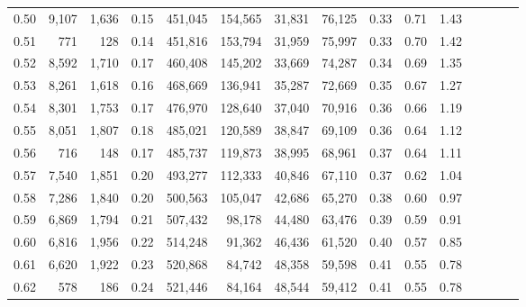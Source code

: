 \begin{tabular}{rrrcrrrrrrrrrrr}
0.50 &   9,107 &  1,636 &                                       0.15 &  451,045 &  154,565 &   31,831 &   76,125 &  0.33 &  0.71 &                         1.43 \\
0.51 &     771 &    128 &                                       0.14 &  451,816 &  153,794 &   31,959 &   75,997 &  0.33 &  0.70 &                         1.42 \\
0.52 &   8,592 &  1,710 &                                       0.17 &  460,408 &  145,202 &   33,669 &   74,287 &  0.34 &  0.69 &                         1.35 \\
0.53 &   8,261 &  1,618 &                                       0.16 &  468,669 &  136,941 &   35,287 &   72,669 &  0.35 &  0.67 &                         1.27 \\
0.54 &   8,301 &  1,753 &                                       0.17 &  476,970 &  128,640 &   37,040 &   70,916 &  0.36 &  0.66 &                         1.19 \\
0.55 &   8,051 &  1,807 &                                       0.18 &  485,021 &  120,589 &   38,847 &   69,109 &  0.36 &  0.64 &                         1.12 \\
0.56 &     716 &    148 &                                       0.17 &  485,737 &  119,873 &   38,995 &   68,961 &  0.37 &  0.64 &                         1.11 \\
0.57 &   7,540 &  1,851 &                                       0.20 &  493,277 &  112,333 &   40,846 &   67,110 &  0.37 &  0.62 &                         1.04 \\
0.58 &   7,286 &  1,840 &                                       0.20 &  500,563 &  105,047 &   42,686 &   65,270 &  0.38 &  0.60 &                         0.97 \\
0.59 &   6,869 &  1,794 &                                       0.21 &  507,432 &   98,178 &   44,480 &   63,476 &  0.39 &  0.59 &                         0.91 \\
0.60 &   6,816 &  1,956 &                                       0.22 &  514,248 &   91,362 &   46,436 &   61,520 &  0.40 &  0.57 &                         0.85 \\
0.61 &   6,620 &  1,922 &                                       0.23 &  520,868 &   84,742 &   48,358 &   59,598 &  0.41 &  0.55 &                         0.78 \\
0.62 &     578 &    186 &                                       0.24 &  521,446 &   84,164 &   48,544 &   59,412 &  0.41 &  0.55 &                         0.78 \\

\end{tabular}
